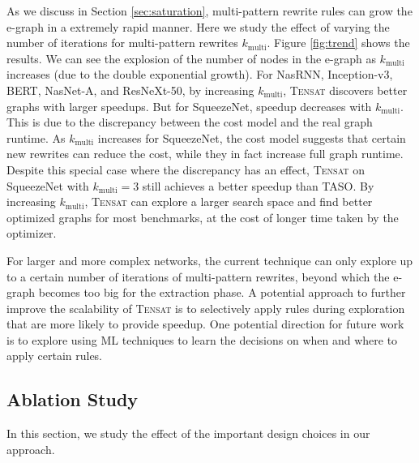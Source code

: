 \documentclass{article}
\newcommand{\ourname}[0]{\textsc{Tensat}}
\begin{document}
As we discuss in Section \ref{sec:saturation}, multi-pattern rewrite rules can grow the e-graph in a extremely rapid manner. 
Here we study the effect of varying the number of iterations for multi-pattern rewrites $k_{\textrm{multi}}$.
Figure \ref{fig:trend} shows the results. 
We can see the explosion of the number of nodes in the e-graph as $k_{\textrm{multi}}$ increases (due to the double exponential growth). 
For NasRNN, Inception-v3, BERT, NasNet-A, and ResNeXt-50, by increasing $k_{\textrm{multi}}$, \ourname{} discovers better graphs with larger speedups. 
But for SqueezeNet, speedup decreases with $k_{\textrm{multi}}$.
This is due to the discrepancy between the cost model and the real graph runtime.
As $k_{\textrm{multi}}$ increases for SqueezeNet, the cost model suggests that certain new rewrites can reduce the cost, while they in fact increase full graph runtime. 
Despite this special case where the discrepancy has an effect, \ourname{} on SqueezeNet with $k_{\textrm{multi}}=3$ still achieves a better speedup than TASO.
By increasing $k_{\textrm{multi}}$, \ourname{} can explore a larger search space and find better optimized graphs for most benchmarks, at the cost of longer time taken by the optimizer. 

For larger and more complex networks, the current technique can only explore up to a certain number of iterations of multi-pattern rewrites, beyond which the e-graph becomes too big for the extraction phase. 
A potential approach to further improve the scalability of \ourname{} is to selectively apply rules during exploration that are more likely to provide speedup. 
One potential direction for future work is to explore using ML techniques to learn the decisions on when and where to apply certain rules. 




\subsection{Ablation Study}
\label{sec:ablation}

In this section, we study the effect of the important design choices in our approach.
\end{document}
